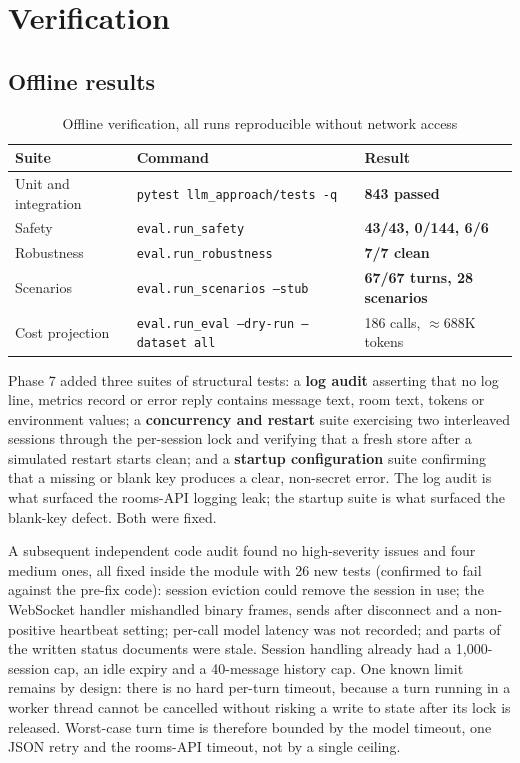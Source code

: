 \documentclass[11pt,a4paper]{article}
\newcommand{\fn}[1]{\texttt{\small #1}}
\begin{document}
\section{Verification}

\subsection{Offline results}

\begin{table}[H]
\centering
\caption{Offline verification, all runs reproducible without network access}
\small
\begin{tabular}{@{}l l l@{}}
\toprule
\textbf{Suite} & \textbf{Command} & \textbf{Result}\\
\midrule
Unit and integration & \fn{pytest llm\_approach/tests -q} & \textbf{\color{hvgreen}843 passed}\\
Safety & \fn{eval.run\_safety} & \textbf{\color{hvgreen}43/43, 0/144, 6/6}\\
Robustness & \fn{eval.run\_robustness} & \textbf{\color{hvgreen}7/7 clean}\\
Scenarios & \fn{eval.run\_scenarios --stub} & \textbf{\color{hvgreen}67/67 turns, 28 scenarios}\\
Cost projection & \fn{eval.run\_eval --dry-run --dataset all} & 186 calls, $\approx$688K tokens\\
\bottomrule
\end{tabular}
\end{table}

Phase 7 added three suites of structural tests: a \textbf{log audit} asserting that no log
line, metrics record or error reply contains message text, room text, tokens or environment
values; a \textbf{concurrency and restart} suite exercising two interleaved sessions through
the per-session lock and verifying that a fresh store after a simulated restart starts clean;
and a \textbf{startup configuration} suite confirming that a missing or blank key produces a
clear, non-secret error. The log audit is what surfaced the rooms-API logging leak; the
startup suite is what surfaced the blank-key defect. Both were fixed.

A subsequent independent code audit found no high-severity issues and four medium ones, all
fixed inside the module with 26 new tests (confirmed to fail against the pre-fix code):
session eviction could remove the session in use; the WebSocket handler mishandled binary
frames, sends after disconnect and a non-positive heartbeat setting; per-call model latency
was not recorded; and parts of the written status documents were stale. Session handling
already had a 1{,}000-session cap, an idle expiry and a 40-message history cap. One known
limit remains by design: there is no hard per-turn timeout, because a turn running in a
worker thread cannot be cancelled without risking a write to state after its lock is
released. Worst-case turn time is therefore bounded by the model timeout, one JSON retry and
the rooms-API timeout, not by a single ceiling.
\end{document}
